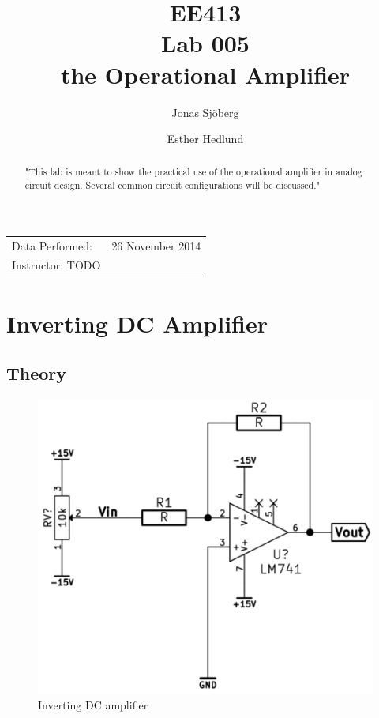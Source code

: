 \documentclass[]{article}
\title{EE413 \\ Lab 005 \\ the Operational Amplifier}
\author{{Jonas Sjöberg} \and {Esther Hedlund}}
\date{}
\begin{document}
\maketitle

\begin{center}
\begin{tabular}{l r}
    Data Performed: & 26 November 2014 \\
    Instructor: TODO
\end{tabular}
\end{center}

\begin{abstract}
"This lab is meant to show the practical use of the operational amplifier in
analog circuit design. Several common circuit configurations will be discussed."
\end{abstract}


\newpage

\section{Inverting DC Amplifier}\label{inverting-dc-amplifier}

\subsection{Theory}\label{theory}

\begin{figure}[htbp]
    \centering
        \includegraphics[scale=0.5]{img/invDCamp.png}
    \caption{Inverting DC amplifier}
    \label{fig:invDCamp}
\end{figure}
\end{document}
